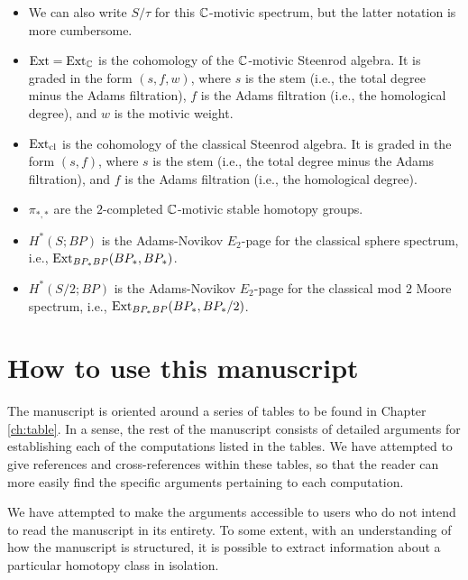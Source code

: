 \begin{itemize}
\item
{}
We can also write $S/\tau$ for this $\mathbb{C}$-motivic spectrum, but the latter
notation is more cumbersome.
\item
$\operatorname{Ext} = \operatorname{Ext}_{\mathbb{C}}$ is the cohomology of the $\mathbb{C}$-motivic Steenrod algebra.
It is graded in the form $(s,f,w)$, where $s$ is the stem (i.e.,
the total degree minus the Adams filtration), $f$ is the Adams
filtration (i.e., the homological degree), and $w$ is the motivic weight.
\item
$\operatorname{Ext}_{\mathrm{cl}}$ is the cohomology of the classical Steenrod algebra.
It is graded in the form $(s,f)$, where $s$ is the stem (i.e.,
the total degree minus the Adams filtration), and $f$ is the Adams
filtration (i.e., the homological degree).
\item
$\pi_{*,*}$ are the $2$-completed $\mathbb{C}$-motivic stable homotopy groups.
\item
$H^*(S; BP)$ is the Adams-Novikov $E_2$-page for the classical
sphere spectrum, i.e., $\operatorname{Ext}_{BP_* BP} (BP_*, BP_*)$.
\item
$H^*(S/2; BP)$ is the Adams-Novikov $E_2$-page for the classical
mod $2$ Moore spectrum, i.e., $\operatorname{Ext}_{BP_* BP} (BP_*, BP_*/2)$.
\end{itemize}

\section{How to use this manuscript}

The manuscript is oriented around a series of tables to be found
in Chapter \ref{ch:table}.  In a sense, the rest of the manuscript
consists of detailed arguments for establishing each of the 
computations listed in the tables.  We have attempted to give 
references and cross-references within these tables, so that the 
reader can more easily find the specific arguments pertaining to
each computation.

We have attempted to make the arguments accessible to users who
do not intend to read the manuscript in its entirety.  To some
extent, with an understanding of how the manuscript is structured,
it is possible to extract information about a particular homotopy
class in isolation.

